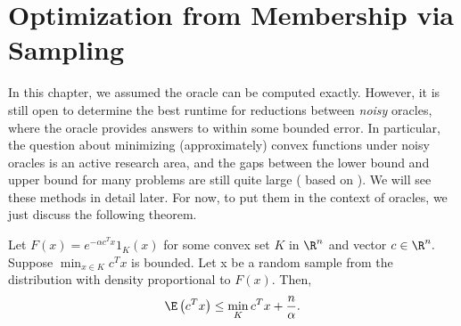 
\section{Optimization from Membership via Sampling}

In this chapter, we assumed the oracle can be computed exactly. However,
it is still open to determine the best runtime for reductions between
\emph{noisy} oracles, where the oracle provides answers to within
some bounded error. In particular, the question about minimizing (approximately)
convex functions under noisy oracles is an active research area, and
the gaps between the lower bound and upper bound for many problems
are still quite large (\cite{belloni2015escaping,Feldman2015statistical,bubeck2016kernel}
based on \cite{Kalai2006simulated}). We will see these methods in
detail later. For now, to put them in the context of oracles, we just
discuss the following theorem.
\begin{thm}
\label{thm:OPTviaSampling} Let $F(x)=e^{-\alpha c^{T}x}1_{K}(x)$
for some convex set $K$ in $\R^{n}$ and vector $c\in\R^{n}.$ Suppose
$\min_{x\in K}c^{T}x$ is bounded. Let x be a random sample from the
distribution with density proportional to $F(x)$. Then, 
\[
\E\left(c^{T}x\right)\le\min_{K}c^{T}x+\frac{n}{\alpha}.
\]
\end{thm}

